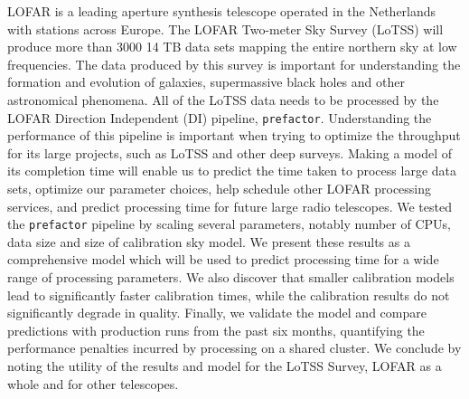 LOFAR is a leading aperture synthesis telescope operated in the Netherlands with stations across Europe. The LOFAR Two-meter Sky Survey (LoTSS) will produce more than 3000 14 TB data sets mapping the entire northern sky at low frequencies. The data produced by this survey is important for understanding the formation and evolution of galaxies, supermassive black holes and other astronomical phenomena. All of the LoTSS data needs to be processed by the LOFAR Direction Independent (DI) pipeline, \texttt{prefactor}. Understanding the performance of this pipeline is important when trying to optimize the throughput for its large projects, such as LoTSS and other deep surveys. Making a model of its completion time will enable us to predict the time taken to process large data sets, optimize our parameter choices, help schedule other LOFAR processing services, and predict processing time for future large radio telescopes. We tested the \texttt{prefactor} pipeline by scaling several parameters, notably number of CPUs, data size and size of calibration sky model. We present these results as a comprehensive model which will be used to predict processing time for a wide range of processing parameters. We also discover that smaller calibration models lead to significantly faster calibration times, while the calibration results do not significantly degrade in quality. Finally, we validate the model and compare predictions with production runs from the past six months, quantifying the performance penalties incurred by processing on a shared cluster. We conclude by noting the utility of the results and model for the LoTSS Survey, LOFAR as a whole and for other telescopes. 
